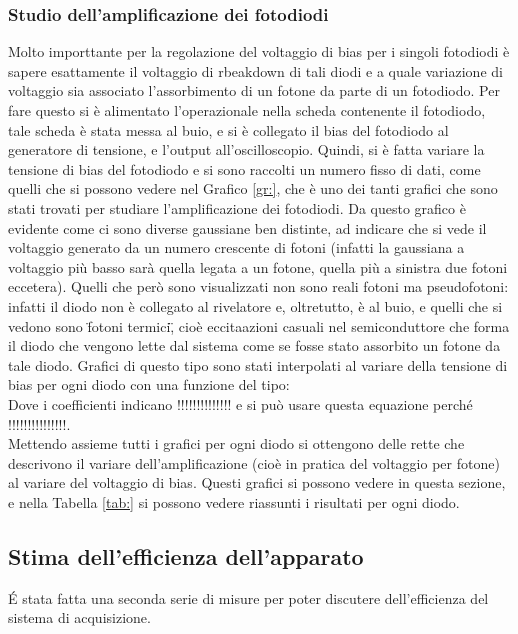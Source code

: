 \subsubsection{Studio dell'amplificazione dei fotodiodi}
Molto importtante per la regolazione del voltaggio di bias per i singoli fotodiodi è sapere esattamente il voltaggio di rbeakdown di tali diodi e a quale variazione di
voltaggio sia associato l'assorbimento di un fotone da parte di un fotodiodo. Per fare questo si è alimentato l'operazionale nella scheda contenente il fotodiodo, tale
scheda è stata messa al buio, e si è collegato il bias del fotodiodo al generatore di tensione, e l'output all'oscilloscopio. Quindi, si è fatta variare la tensione
di bias del fotodiodo e si sono raccolti un numero fisso di dati, come quelli che si possono vedere nel Grafico \ref{gr:}, che è uno dei tanti grafici che sono stati
trovati per studiare l'amplificazione dei fotodiodi. Da questo grafico è evidente come ci sono diverse gaussiane ben distinte, ad indicare che si vede il voltaggio
generato da un numero crescente di fotoni (infatti la gaussiana a voltaggio più basso sarà quella legata a un fotone, quella più a sinistra due fotoni eccetera).
Quelli che però sono visualizzati non sono reali fotoni ma pseudofotoni: infatti il diodo non è collegato al rivelatore e, oltretutto, è al buio, e quelli che si
vedono sono \"fotoni termici\", cioè eccitaazioni casuali nel semiconduttore che forma il diodo che vengono lette dal sistema come se fosse stato assorbito un fotone
da tale diodo. Grafici di questo tipo sono stati interpolati al variare della tensione di bias per ogni diodo con una funzione del tipo:
\begin{equation}
\end{equation}
Dove i coefficienti indicano !!!!!!!!!!!!!! e si può usare questa equazione perché !!!!!!!!!!!!!!!.\\

Mettendo assieme tutti i grafici per ogni diodo si ottengono delle rette che descrivono il variare dell'amplificazione (cioè in pratica del voltaggio per fotone) al variare
del voltaggio di bias. Questi grafici si possono vedere in questa sezione, e nella Tabella \ref{tab:} si possono vedere riassunti i risultati per ogni diodo.

\subsection{Stima dell'efficienza dell'apparato}
\'E stata fatta una seconda serie di misure per poter discutere dell'efficienza del sistema di acquisizione.
